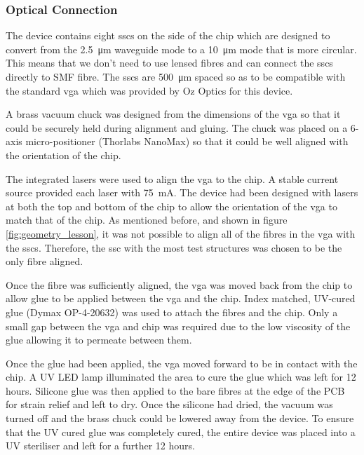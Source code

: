\subsubsection*{Optical Connection}

The device contains eight \acp{ssc} on the side of the chip which are designed to convert from the \SI{2.5}{\um} waveguide mode to a \SI{10}{\um} mode that is more circular. This means that we don't need to use lensed fibres and can connect the \acp{ssc} directly to SMF fibre. The \acp{ssc} are \SI{500}{\um} spaced so as to be compatible with the standard \acs{vga} which was provided by Oz Optics for this device. 

A brass vacuum chuck was designed from the dimensions of the \ac{vga} so that it could be securely held during alignment and gluing. The chuck was placed on a 6-axis micro-positioner (Thorlabs NanoMax) so that it could be well aligned with the orientation of the chip. 

The integrated lasers were used to align the \ac{vga} to the chip. A stable current source provided each laser with \SI{75}{\mA}. The device had been designed with lasers at both the top and bottom of the chip to allow the orientation of the \ac{vga} to match that of the chip. As mentioned before, and shown in figure \ref{fig:geometry_lesson}, it was not possible to align all of the fibres in the \ac{vga} with the \acp{ssc}. Therefore, the \ac{ssc} with the most test structures was chosen to be the only fibre aligned. 


Once the fibre was sufficiently aligned, the \ac{vga} was moved back from the chip to allow glue to be applied between the \ac{vga} and the chip. Index matched, UV-cured glue (Dymax OP-4-20632) was used to attach the fibres and the chip. Only a small gap between the \ac{vga} and chip was required due to the low viscosity of the glue allowing it to permeate between them. 

Once the glue had been applied, the \ac{vga} moved forward to be in contact with the chip. A UV LED lamp illuminated the area to cure the glue which was left for 12 hours. Silicone glue was then applied to the bare fibres at the edge of the PCB for strain relief and left to dry. Once the silicone had dried, the vacuum was turned off and the brass chuck could be lowered away from the device. To ensure that the UV cured glue was completely cured, the entire device was placed into a UV steriliser and left for a further 12 hours. 

